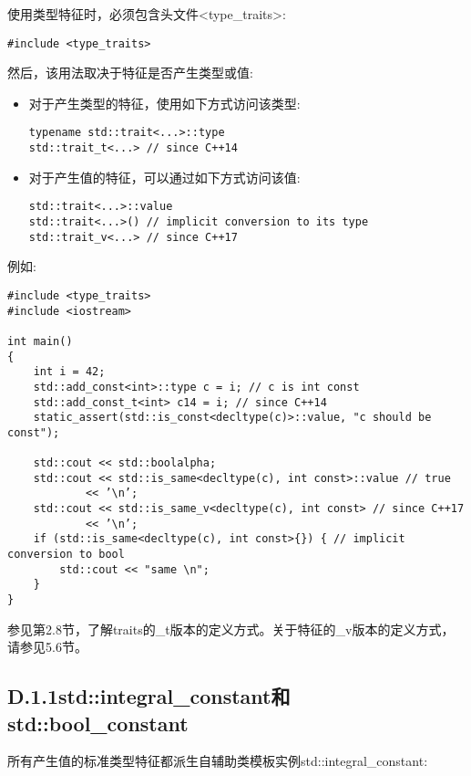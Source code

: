 
使用类型特征时，必须包含头文件<type\_traits>:

\begin{lstlisting}[style=styleCXX]
#include <type_traits>
\end{lstlisting}

然后，该用法取决于特征是否产生类型或值:

\begin{itemize}
\item 
对于产生类型的特征，使用如下方式访问该类型:
\begin{lstlisting}[style=styleCXX]
typename std::trait<...>::type
std::trait_t<...> // since C++14
\end{lstlisting}

\item 
对于产生值的特征，可以通过如下方式访问该值:
\begin{lstlisting}[style=styleCXX]
std::trait<...>::value
std::trait<...>() // implicit conversion to its type
std::trait_v<...> // since C++17
\end{lstlisting}
\end{itemize}

例如:

\begin{lstlisting}[style=styleCXX]
#include <type_traits>
#include <iostream>

int main()
{
	int i = 42;
	std::add_const<int>::type c = i; // c is int const
	std::add_const_t<int> c14 = i; // since C++14
	static_assert(std::is_const<decltype(c)>::value, "c should be const");
	
	std::cout << std::boolalpha;
	std::cout << std::is_same<decltype(c), int const>::value // true
			<< ’\n’;
	std::cout << std::is_same_v<decltype(c), int const> // since C++17
			<< ’\n’;
	if (std::is_same<decltype(c), int const>{}) { // implicit conversion to bool
		std::cout << "same \n";
	}
}
\end{lstlisting}

参见第2.8节，了解traits的\_t版本的定义方式。关于特征的\_v版本的定义方式，请参见5.6节。

\subsection{D.1.1\hspace{0.2cm}std::integral\_constant和std::bool\_constant}

所有产生值的标准类型特征都派生自辅助类模板实例std::integral\_constant:

